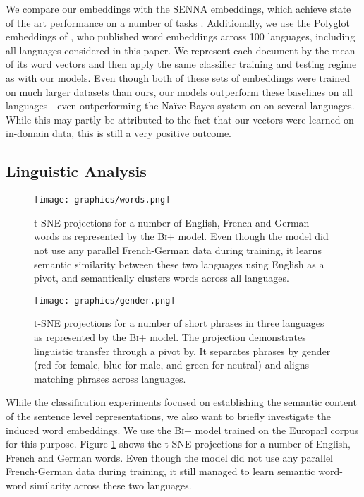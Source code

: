 \documentclass[11pt]{article}
\newcommand{\flatModplus}{\textsc{Bi+}\xspace}
\begin{document}
We compare our embeddings with the SENNA embeddings, which achieve state of the
art performance on a number of tasks \cite{Collobert:2011}. Additionally, we
use the Polyglot embeddings of , who published word
embeddings across 100 languages, including all languages considered in this
paper. We represent each document by the mean of its word vectors and then
apply the same classifier training and testing regime as with our models. Even
though both of these sets of embeddings were trained on much larger datasets
than ours, our models outperform these baselines on all languages---even
outperforming the Na\"{i}ve Bayes system on on several languages. While this
may partly be attributed to the fact that our vectors were learned on in-domain
data, this is still a very positive outcome.
 
\subsection{Linguistic Analysis}\label{sec:qualitative}

\begin{figure}[t]\centering
  \captionsetup{font=small}
\texttt{[image: graphics/words.png]}
\caption{t-SNE projections for a number of English, French and German words as
  represented by the \flatModplus model. Even though the model did not use any
  parallel French-German data during training, it learns semantic similarity
  between these two languages using English as a pivot, and semantically
  clusters words across all languages.}\label{fig:words}
\end{figure}

\begin{figure}[t]\centering
  \captionsetup{font=small}
\texttt{[image: graphics/gender.png]}
\caption{t-SNE projections for a number of short phrases in three languages as
  represented by the \flatModplus model. The projection demonstrates linguistic
  transfer through a pivot by. It separates phrases by gender (red for female,
    blue for male, and green for neutral) and aligns matching phrases across
  languages.}\label{fig:gender}
\end{figure}

While the classification experiments focused on establishing the semantic
content of the sentence level representations, we also want to briefly
investigate the induced word embeddings.  We use the \flatModplus model trained
on the Europarl corpus for this purpose.  Figure \ref{fig:words} shows the t-SNE
projections for a number of English, French and German words.  Even though the
model did not use any parallel French-German data during training, it still
managed to learn semantic word-word similarity across these two languages.
\end{document}
